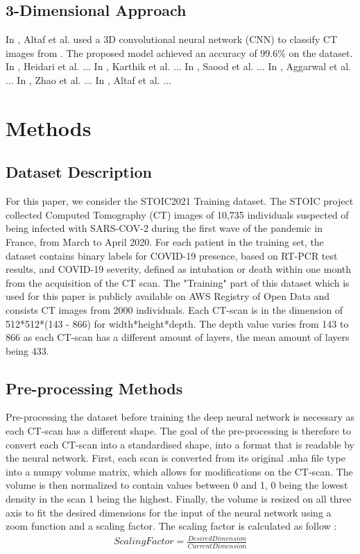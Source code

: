 \documentclass[12pt, letterpaper]{article}
\begin{document}
\subsection{3-Dimensional Approach}
In \cite{Altaf_2021}, Altaf et al. used a 3D convolutional neural network (CNN) to classify CT images from \cite{Angelov_2020}. The proposed model achieved an accuracy of 99.6\% on the dataset.
In \cite{Heidari_2022}, Heidari et al. ...
In \cite{Karthik_2021}, Karthik et al. ...
In \cite{Saood_2021}, Saood et al. ...
In \cite{Aggarwal_2022}, Aggarwal et al. ...
In \cite{Zhao_2020}, Zhao et al. ...
In \cite{Altaf_2021}, Altaf et al. ...

\newpage
\section{Methods}

\subsection{Dataset Description}
For this paper, we consider the STOIC2021 Training dataset. The STOIC project collected Computed Tomography (CT) images of 10,735 individuals suspected of being infected with SARS-COV-2 during the first wave of the pandemic in France, from March to April 2020. For each patient in the training set, the dataset contains binary labels for COVID-19 presence, based on RT-PCR test results, and COVID-19 severity, defined as intubation or death within one month from the acquisition of the CT scan\cite{Revel_2021}. The "Training" part of this dataset which is used for this paper is publicly available on AWS Registry of Open Data \cite{STOIC_Training} and consists CT images from 2000 individuals. Each CT-scan is in the dimension of 512*512*(143 - 866) for width*height*depth. The depth value varies from 143 to 866 as each CT-scan has a different amount of layers, the mean amount of layers being 433.
\subsection{Pre-processing Methods}

Pre-processing the dataset before training the deep neural network is necessary as each CT-scan has a different shape. The goal of the pre-processing is therefore to convert each CT-scan into a standardised shape, into a format that is readable by the neural network. First, each scan is converted from its original .mha file type into a numpy volume matrix, which allows for modifications on the CT-scan. The volume is then normalized to contain values between 0 and 1, 0 being the lowest density in the scan 1 being the highest. Finally, the volume is resized on all three axis to fit the desired dimensions for the input of the neural network using a zoom function and a scaling factor. The scaling factor is calculated as follow : \begin{align}
    Scaling Factor = \frac{Desired Dimension}{Current Dimension}
\end{align}
\end{document}
